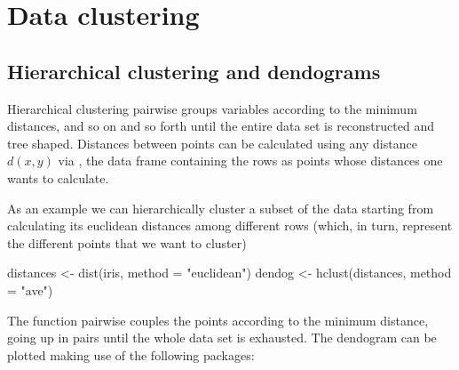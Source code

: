 \section{Data clustering}\label{sec: clusters}

\subsection*{Hierarchical clustering and dendograms}
Hierarchical clustering pairwise groups 
variables according to the minimum distances,
and so on and so forth until the entire data 
set is reconstructed and tree shaped. Distances
between points can be calculated using any
distance $d(x,y)$ via
, the data frame
containing the rows as points whose distances one
wants to calculate. 
\medskip 

As an example we can hierarchically cluster a subset
of the  data starting from calculating 
its euclidean distances among different rows (which, 
in turn, represent the different points that we want
to cluster)
\begin{example}
distances <- dist(iris, method = "euclidean")
dendog    <- hclust(distances, method = "ave") 
\end{example}
The function  pairwise couples the points
according to the minimum distance, going up in pairs until
the whole data set is exhausted.
\bigskip
The dendogram can be plotted making use of the 
following packages:\\
\\
\\
\bigskip 

